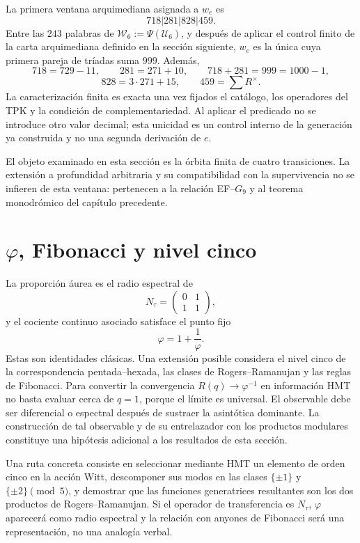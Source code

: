 La primera ventana arquimediana asignada a \(w_e\) es
\[
718|281|828|459.
\]
Entre las \(243\) palabras de
\(\mathcal W_6:=\Psi(\mathcal U_6)\), y después de aplicar el control finito
de la carta arquimediana definido en la sección siguiente, \(w_e\) es la única
cuya primera pareja de tríadas suma \(999\). Además,
\[
718=729-11,
\qquad
281=271+10,
\qquad
718+281=999=1000-1,
\]
\[
828=3\cdot271+15,
\qquad
459=\sum R^\times.
\]
La caracterización finita es exacta una vez fijados el catálogo, los
operadores del TPK y la condición de complementariedad. Al aplicar el
predicado no se introduce otro valor decimal; esta unicidad es un control
interno de la generación ya construida y no una segunda derivación de \(e\).

El objeto examinado en esta sección es la órbita finita de cuatro
transiciones. La extensión a profundidad arbitraria y su compatibilidad con
la supervivencia no se infieren de esta ventana: pertenecen a la relación
EF--\(G_9\) y al teorema monodrómico del capítulo precedente.

\section{\texorpdfstring{\(\varphi\)}{phi}, Fibonacci y nivel cinco}

La proporción áurea es el radio espectral de
\[
N_\tau=\begin{pmatrix}0&1\\1&1\end{pmatrix},
\]
y el cociente continuo asociado satisface el punto fijo
\[
\varphi=1+\frac1\varphi.
\]
Estas son identidades clásicas. Una extensión posible considera el nivel
cinco de la correspondencia pentada--hexada, las clases
de Rogers--Ramanujan y las reglas de Fibonacci. Para convertir la convergencia
\(R(q)\to\varphi^{-1}\) en información HMT no basta evaluar cerca de
\(q=1\), porque el límite es universal. El observable debe ser diferencial o
espectral después de sustraer la asintótica dominante. La construcción de tal
observable y de su entrelazador con los productos modulares constituye una
hipótesis adicional a los resultados de esta sección.

\begin{remark}
Una ruta concreta consiste en seleccionar mediante HMT un elemento de orden
cinco en la acción Witt, descomponer sus modos en las clases
\(\{\pm1\}\) y \(\{\pm2\}\pmod5\), y demostrar que las funciones
generatrices resultantes son los dos productos de Rogers--Ramanujan. Si el
operador de transferencia es \(N_\tau\), \(\varphi\) aparecerá como radio
espectral y la relación con anyones de Fibonacci será una representación, no
una analogía verbal.
\end{remark}

